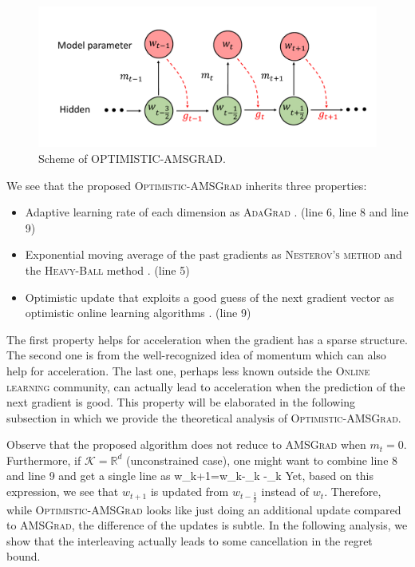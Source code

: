 \documentclass[11pt]{article}
\def\K{\mathcal{K}}
\theoremstyle{k}
\begin{document}
\begin{figure}[H]
    \hspace{-0.15in}
    \includegraphics[width=4.6in]{plot.pdf}
    \caption{Scheme of \textsc{OPTIMISTIC-AMSGRAD}.}
     \label{scheme}
\end{figure}


We see that the proposed \textsc{Optimistic-AMSGrad} inherits three properties:
\begin{itemize}
\item Adaptive learning rate of each dimension as \textsc{AdaGrad} \cite{DHS11}. (line 6, line 8 and line 9)
\item Exponential moving average of the past gradients as \textsc{Nesterov's method} \cite{N04} and the \textsc{Heavy-Ball} method \cite{P64}. (line 5)
\item Optimistic update that exploits a good guess of the next gradient vector
as optimistic online learning algorithms \cite{CJ12,RS13,SALS15}. (line 9)
\end{itemize}

The first property helps for acceleration when the gradient has a sparse structure.
The second one is from the well-recognized idea of momentum which can also help for acceleration. The last one, perhaps less known outside the \textsc{Online learning} community, can actually lead to acceleration when the prediction of the next gradient is good. This property will be elaborated in the following subsection in which we provide the theoretical analysis of \textsc{Optimistic-AMSGrad}.


Observe that the proposed algorithm does not reduce to \textsc{AMSGrad} when $m_{t}=0$.
Furthermore, if $\K = \mathbb R^{d}$ (unconstrained case), one might want to combine line 8 and line 9 and get a single line as 
\beq\label{eq:finalupdate}
w_{k+1}=w_{k}-\eta_{k} -\eta_{k} 
\eeq
Yet, based on this expression, we see that $w_{t+1}$ is updated from $w_{t-\frac{1}{2}}$ instead of $w_t$. Therefore, while \textsc{Optimistic-AMSGrad} looks like just doing an additional update compared to \textsc{AMSGrad}, the difference of the updates is subtle.
In the following analysis, we show that the interleaving actually leads to some cancellation in the regret bound.
\end{document}

